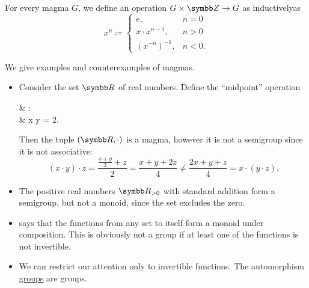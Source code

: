 \begin{definition}\label{def:magma_exponentiation}
  For every magma \( G \), we define an operation \( G \times \BZ \to G \) as inductively\IND as
  \begin{equation*}
    x^n \coloneqq \begin{cases}
      e,               & n = 0  \\
      x \cdot x^{n-1}, & n > 0  \\
      (x^{-n})^{-1},   & n < 0.
    \end{cases}
  \end{equation*}
\end{definition}

\begin{example}\label{ex:magmas}
  We give examples and counterexamples of magmas.

  \begin{itemize}
    \item Consider the set \( \BR \) of real numbers. Define the \enquote{midpoint} operation
          \begin{BreakableAlign*}
             & \cdot: \BR \times \BR \to \BR \\
             & x \cdot y =  2.
          \end{BreakableAlign*}

          Then the tuple \( (\BR, \cdot) \) is a magma, however it is not a semigroup since it is not associative:
          \begin{equation*}
            (x \cdot y) \cdot z = \frac {{\frac {x + y} 2} + z} 2 = \frac {x + y + 2z} 4
            \neq
            \frac {2x + y + z} 4 = x \cdot (y \cdot z).
          \end{equation*}

    \item The positive real numbers \( \BR_{>0} \) with standard addition form a semigroup, but not a monoid, since the set excludes the zero.

    \item {} says that the functions from any set to itself form a monoid under composition. This is obviously not a group if at least one of the functions is not invertible.

    \item We can restrict our attention only to invertible functions. The automorphism \hyperref[def:automorphism_group]{groups} are groups.
  \end{itemize}
\end{example}

